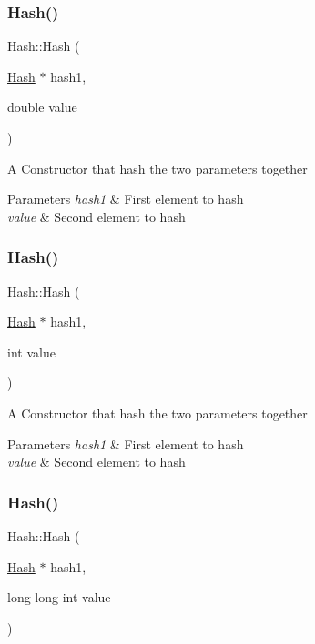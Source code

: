 \subsubsection{\texorpdfstring{Hash()}{Hash()}\hspace{0.1cm}{\footnotesize\ttfamily [3/8]}}
{\footnotesize\ttfamily Hash\+::\+Hash (\begin{DoxyParamCaption}\item[{\mbox{\hyperlink{classHash}{Hash}} $\ast$}]{hash1,  }\item[{double}]{value }\end{DoxyParamCaption})}

A Constructor that hash the two parameters together


\begin{DoxyParams}{Parameters}
{\em hash1} & First element to hash \\
\hline
{\em value} & Second element to hash \\
\hline
\end{DoxyParams}
\mbox{\label{classHash_aa86acb0f09e74c9e6c75adc063539454}} 
\subsubsection{\texorpdfstring{Hash()}{Hash()}\hspace{0.1cm}{\footnotesize\ttfamily [4/8]}}
{\footnotesize\ttfamily Hash\+::\+Hash (\begin{DoxyParamCaption}\item[{\mbox{\hyperlink{classHash}{Hash}} $\ast$}]{hash1,  }\item[{int}]{value }\end{DoxyParamCaption})}

A Constructor that hash the two parameters together


\begin{DoxyParams}{Parameters}
{\em hash1} & First element to hash \\
\hline
{\em value} & Second element to hash \\
\hline
\end{DoxyParams}
\mbox{\label{classHash_a523bc61e293e280273dbcd51d6b13905}} 
\subsubsection{\texorpdfstring{Hash()}{Hash()}\hspace{0.1cm}{\footnotesize\ttfamily [5/8]}}
{\footnotesize\ttfamily Hash\+::\+Hash (\begin{DoxyParamCaption}\item[{\mbox{\hyperlink{classHash}{Hash}} $\ast$}]{hash1,  }\item[{long long int}]{value }\end{DoxyParamCaption})}

